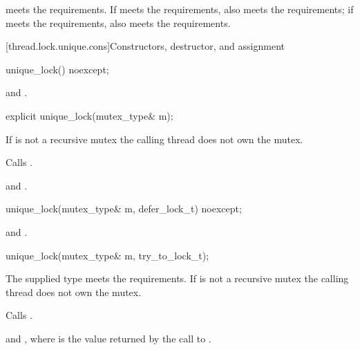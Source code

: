 \pnum
\begin{note}
 meets the  requirements. If 
meets the  requirements,
 also meets the  requirements;
if 
meets the  requirements,
 also meets the  requirements.
\end{note}

[thread.lock.unique.cons]{Constructors, destructor, and assignment}

%
\begin{itemdecl}
unique_lock() noexcept;
\end{itemdecl}

\begin{itemdescr}
\pnum
\ensures
{} and .
\end{itemdescr}

%
\begin{itemdecl}
explicit unique_lock(mutex_type& m);
\end{itemdecl}

\begin{itemdescr}
\pnum
\expects
If  is not a recursive mutex the calling thread does not own the mutex.

\pnum
\effects
Calls .

\pnum
\ensures
{} and .
\end{itemdescr}

%
\begin{itemdecl}
unique_lock(mutex_type& m, defer_lock_t) noexcept;
\end{itemdecl}

\begin{itemdescr}
\pnum
\ensures
{} and .
\end{itemdescr}

%
\begin{itemdecl}
unique_lock(mutex_type& m, try_to_lock_t);
\end{itemdecl}

\begin{itemdescr}
\pnum
\expects
The supplied  type meets the 
requirements.
If  is not a recursive mutex the calling thread does not own the mutex.

\pnum
\effects
Calls .

\pnum
\ensures
{} and ,
where  is the value returned by the call to .
\end{itemdescr}


